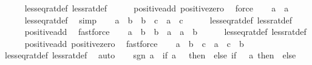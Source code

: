 \begin{isabellebody}
\ \ \ \ \isamarkupfalse%
\ less{\isacharunderscore}{\kern0pt}eq{\isacharunderscore}{\kern0pt}rat{\isacharunderscore}{\kern0pt}def\ less{\isacharunderscore}{\kern0pt}rat{\isacharunderscore}{\kern0pt}def\isanewline
\ \ \ \ \isamarkupfalse%
\ positive{\isacharunderscore}{\kern0pt}add\ positive{\isacharunderscore}{\kern0pt}zero\ \isamarkupfalse%
\ force\isanewline
\ \ \isamarkupfalse%
\ {\isachardoublequoteopen}a\ {\isasymle}\ a{\isachardoublequoteclose}\isanewline
\ \ \ \ \isamarkupfalse%
\ less{\isacharunderscore}{\kern0pt}eq{\isacharunderscore}{\kern0pt}rat{\isacharunderscore}{\kern0pt}def\ \isamarkupfalse%
\ simp\isanewline
\ \ \isamarkupfalse%
\ {\isachardoublequoteopen}a\ {\isasymle}\ b\ {\isasymLongrightarrow}\ b\ {\isasymle}\ c\ {\isasymLongrightarrow}\ a\ {\isasymle}\ c{\isachardoublequoteclose}\isanewline
\ \ \ \ \isamarkupfalse%
\ less{\isacharunderscore}{\kern0pt}eq{\isacharunderscore}{\kern0pt}rat{\isacharunderscore}{\kern0pt}def\ less{\isacharunderscore}{\kern0pt}rat{\isacharunderscore}{\kern0pt}def\isanewline
\ \ \ \ \isamarkupfalse%
\ positive{\isacharunderscore}{\kern0pt}add\ \isamarkupfalse%
\ fastforce\isanewline
\ \ \isamarkupfalse%
\ {\isachardoublequoteopen}a\ {\isasymle}\ b\ {\isasymLongrightarrow}\ b\ {\isasymle}\ a\ {\isasymLongrightarrow}\ a\ {\isacharequal}{\kern0pt}\ b{\isachardoublequoteclose}\isanewline
\ \ \ \ \isamarkupfalse%
\ less{\isacharunderscore}{\kern0pt}eq{\isacharunderscore}{\kern0pt}rat{\isacharunderscore}{\kern0pt}def\ less{\isacharunderscore}{\kern0pt}rat{\isacharunderscore}{\kern0pt}def\isanewline
\ \ \ \ \isamarkupfalse%
\ positive{\isacharunderscore}{\kern0pt}add\ positive{\isacharunderscore}{\kern0pt}zero\ \isamarkupfalse%
\ fastforce\isanewline
\ \ \isamarkupfalse%
\ {\isachardoublequoteopen}a\ {\isasymle}\ b\ {\isasymLongrightarrow}\ c\ {\isacharplus}{\kern0pt}\ a\ {\isasymle}\ c\ {\isacharplus}{\kern0pt}\ b{\isachardoublequoteclose}\isanewline
\ \ \ \ \isamarkupfalse%
\ less{\isacharunderscore}{\kern0pt}eq{\isacharunderscore}{\kern0pt}rat{\isacharunderscore}{\kern0pt}def\ less{\isacharunderscore}{\kern0pt}rat{\isacharunderscore}{\kern0pt}def\ \isamarkupfalse%
\ auto\isanewline
\ \ \isamarkupfalse%
\ {\isachardoublequoteopen}sgn\ a\ {\isacharequal}{\kern0pt}\ {\isacharparenleft}{\kern0pt}if\ a\ {\isacharequal}{\kern0pt}\ {}\ then\ {}\ else\ if\ {}\ {\isacharless}{\kern0pt}\ a\ then\ {}\ else\ {\isacharminus}{\kern0pt}\ {}{\isacharparenright}{\kern0pt}{\isachardoublequoteclose}\isanewline

\end{isabellebody}
